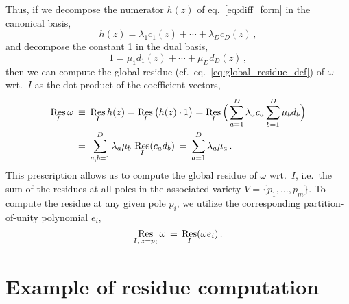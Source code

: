 \documentclass[dvipsnames,preprint,12pt,sort&compress]{elsarticle}
\begin{document}
Thus, if we decompose the numerator $h(z)$ of eq.~\eqref{eq:diff_form} in the canonical basis,
\begin{equation}
h(z) = \lambda_1 c_1 (z) + \cdots + \lambda_D c_D (z) \,,
\end{equation}
and decompose the constant 1 in the dual basis,
\begin{equation}
1 = \mu_1 d_1 (z) + \cdots + \mu_D d_D (z) \,,
\end{equation}
then we can compute the global residue (cf.~eq.~\eqref{eq:global_residue_def})
of $\omega$ wrt.~$I$ as the dot product of the coefficient vectors,
\begin{align}
\mathop{\mathrm{Res}}_I \omega \hspace{0.7mm} &\equiv \hspace{0.7mm} \mathop{\mathrm{Res}}_I h(z)
= \mathop{\mathrm{Res}}_I \big( h(z) \cdot 1 \big)
= \mathop{\mathrm{Res}}_I \Big(\sum_{a=1}^D \lambda_a c_a \sum_{b=1}^D \mu_b d_b \Big) \\
&= \hspace{0.7mm} \sum_{a,b=1}^D \lambda_a \mu_b \hspace{0.6mm} \mathop{\mathrm{Res}}_I (c_a d_b)
\hspace{0.7mm}=\hspace{0.7mm} \sum_{a=1}^D \lambda_a \mu_a \,.
\end{align}
This prescription allows us to compute the global residue of $\omega$ wrt.~$I$,
i.e.~the sum of the residues at all poles in the associated variety
$V = \{ p_1, \ldots, p_m\}$. To compute the residue at any given pole $p_i$,
we utilize the corresponding partition-of-unity polynomial $e_i$,
\begin{equation}
\mathop{\mathrm{Res}}_{I, \hspace{0.6mm} z=p_i} \omega \hspace{0.6mm}=\hspace{0.6mm}
\mathop{\mathrm{Res}}_I (\omega e_i) \,.
\end{equation}


\section{Example of residue computation}\label{sec:example}
\end{document}
